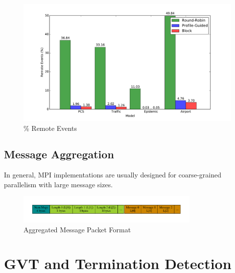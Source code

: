 \documentclass[11pt]{book}
\begin{document}
\begin{figure}
\begin{minipage}{.5\textwidth}
  \end{minipage}
  \centering
  \begin{minipage}{.5\textwidth}
    \begin{center}
      \includegraphics[width=\textwidth,keepaspectratio,quiet]{figs/partitioning_communication/partitioning_premote_8node.pdf} \\
      \% Remote Events \\
    \end{center}
  \end{minipage}
\end{figure}

\section{Message Aggregation}

In general, MPI implementations are usually designed for coarse-grained parallelism with large
message sizes.


\begin{figure}
    \centering
    \includegraphics[width=0.8\textwidth,quiet]{figs/graphviz/aggregation_format.pdf}
    \caption{Aggregated Message Packet Format}
\end{figure}



\chapter{GVT and Termination Detection}\label{gvt_termination}
\end{document}

